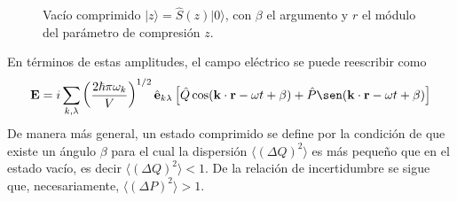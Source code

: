 \begin{figure}[!h]


  \caption{Vacío comprimido $\vert z \rangle = \hat{S}(z)\vert 0 \rangle$, con $\beta$ el argumento y $r$ el módulo del parámetro de compresión $z$.}
  \label{fig:squeezed-vacuum}
\end{figure}


En términos de estas amplitudes, el campo eléctrico se puede reescribir como
\begin{equation*}
  \mathbf{E} = i \sum_{k,\lambda} \left( \frac{2\hbar \pi \omega_k}{V} \right)^{1/2} \hat{\mathbf{e}}_{k\lambda} \left[ \hat{Q}\cos(\mathbf{k}\cdot\mathbf{r} - \omega t + \beta) + \hat{P}\sen(\mathbf{k}\cdot\mathbf{r} - \omega t + \beta) \right]
\end{equation*}
De manera más general, un estado comprimido se define por la condición de que existe un ángulo $\beta$ para el cual la dispersión $\langle (\Delta Q)^2 \rangle$ es más pequeño que en el estado vacío, es decir $\langle (\Delta Q)^2 \rangle < 1$. De la relación de incertidumbre se sigue que, necesariamente, $\langle (\Delta P)^2 \rangle > 1$.

